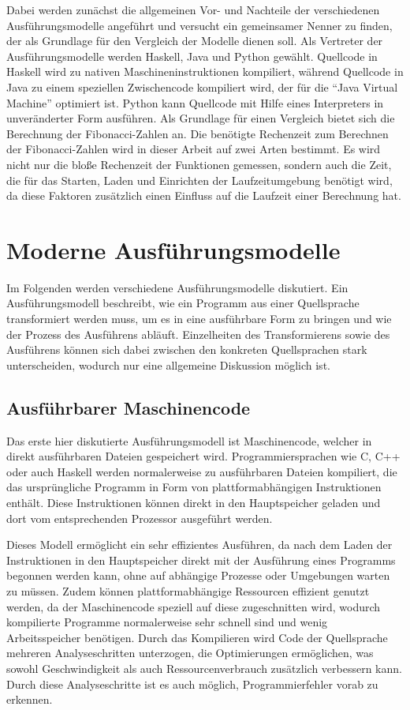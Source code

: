 \documentclass[11pt, parskip=half]{scrartcl}       %
\begin{document}
Dabei werden zunächst die allgemeinen Vor- und Nachteile der verschiedenen Ausführungsmodelle angeführt und versucht ein gemeinsamer Nenner zu finden, der als Grundlage für den Vergleich der Modelle dienen soll.
Als Vertreter der Ausführungsmodelle werden Haskell, Java und Python gewählt.
Quellcode in Haskell wird zu nativen Maschineninstruktionen kompiliert, während Quellcode in Java zu einem speziellen Zwischencode kompiliert wird, der für die ``Java Virtual Machine'' optimiert ist.
Python kann Quellcode mit Hilfe eines Interpreters in unveränderter Form ausführen.
Als Grundlage für einen Vergleich bietet sich die Berechnung der Fibonacci-Zahlen an.
Die benötigte Rechenzeit zum Berechnen der Fibonacci-Zahlen wird in dieser Arbeit auf zwei Arten bestimmt.
Es wird nicht nur die bloße Rechenzeit der Funktionen gemessen, sondern auch die Zeit, die für das Starten, Laden und Einrichten der Laufzeitumgebung benötigt wird, da diese Faktoren zusätzlich einen Einfluss auf die Laufzeit einer Berechnung hat.


\section{Moderne Ausführungsmodelle}

Im Folgenden werden verschiedene Ausführungsmodelle diskutiert.
Ein Ausführungsmodell beschreibt, wie ein Programm aus einer Quellsprache transformiert werden muss, um es in eine ausführbare Form zu bringen und wie der Prozess des Ausführens abläuft.\cite{execution_systems}
Einzelheiten des Transformierens sowie des Ausführens können sich dabei zwischen den konkreten Quellsprachen stark unterscheiden, wodurch nur eine allgemeine Diskussion möglich ist.

\subsection{Ausführbarer Maschinencode}

Das erste hier diskutierte Ausführungsmodell ist Maschinencode, welcher in direkt ausführbaren Dateien gespeichert wird.
Programmiersprachen wie C, C++ oder auch Haskell werden normalerweise zu ausführbaren Dateien kompiliert, die das ursprüngliche Programm in Form von plattformabhängigen Instruktionen enthält.
Diese Instruktionen können direkt in den Hauptspeicher geladen und dort vom entsprechenden Prozessor ausgeführt werden.

Dieses Modell ermöglicht ein sehr effizientes Ausführen, da nach dem Laden der Instruktionen in den Hauptspeicher direkt mit der Ausführung eines Programms begonnen werden kann, ohne auf abhängige Prozesse oder Umgebungen warten zu müssen.
Zudem können plattformabhängige Ressourcen effizient genutzt werden, da der Maschinencode speziell auf diese zugeschnitten wird, wodurch kompilierte Programme normalerweise sehr schnell sind und wenig Arbeitsspeicher benötigen.
Durch das Kompilieren wird Code der Quellsprache mehreren Analyseschritten\cite{advanced_compiler_design} unterzogen, die Optimierungen ermöglichen, was sowohl Geschwindigkeit als auch Ressourcenverbrauch zusätzlich verbessern kann.
Durch diese Analyseschritte ist es auch möglich, Programmierfehler vorab zu erkennen.
\end{document}
